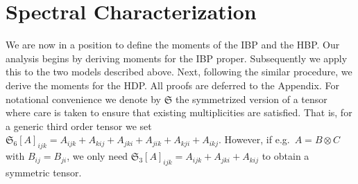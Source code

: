 \documentclass[twoside,11pt]{article}
\newcommand{\symm}{\mathfrak{S}}
\begin{document}
\section{Spectral Characterization}
\label{sec:moments}

We are now in a position to define the moments of the IBP and the HBP.
Our analysis begins by deriving moments
for the IBP proper. Subsequently we apply this to the two models
described above. Next, following the similar procedure, we derive the moments for the HDP. All proofs are deferred to the Appendix. For
notational convenience we denote by $\symm$ the symmetrized version of
a tensor where care is taken to ensure that existing multiplicities
are satisfied. That is, for a generic third order tensor 
we set $\symm_6[A]_{ijk} = A_{ijk} + A_{kij} + A_{jki} + A_{jik} + A_{kji} +
A_{ikj}$. However, if e.g.\ $A = B \otimes C$ with $B_{ij} = B_{ji}$,
we only need $\symm_3[A]_{ijk} = A_{ijk} + A_{jki}+ A_{kij}$ to
obtain a symmetric tensor.
\end{document}
